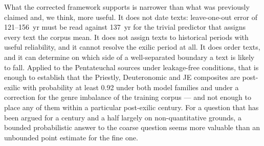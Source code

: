 What the corrected framework supports is narrower than what was previously
claimed and, we think, more useful.  It does not date texts: leave-one-out
error of 121--156~yr must be read against 137~yr for the trivial predictor
that assigns every text the corpus mean.  It does not assign texts to
historical periods with useful reliability, and it cannot resolve the
exilic period at all.  It does order texts, and it can determine on which
side of a well-separated boundary a text is likely to fall.  Applied to the
Pentateuchal sources under leakage-free conditions, that is enough to
establish that the Priestly, Deuteronomic and JE composites are post-exilic
with probability at least 0.92 under both model families and under a
correction for the genre imbalance of the training corpus --- and not
enough to place any of them within a particular post-exilic century.  For a
question that has been argued for a century and a half largely on
non-quantitative grounds, a bounded probabilistic answer to the coarse
question seems more valuable than an unbounded point estimate for the fine
one.
